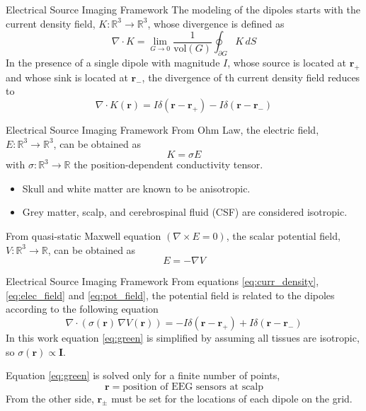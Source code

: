\documentclass[progressbar=head]{beamer}
\newcommand{\ppar}[1]{ \left( #1 \right) }
\newcommand{\id}{\mathbf{I}}
\newcommand{\R}{\mathbb{R}}
\newcommand{\rr}{\mathbf{r}}
\begin{document}
\begin{frame}{Electrical Source Imaging Framework}
    The modeling of the dipoles starts with the \alert{current density field}, $K: \R^3 \rightarrow \R^3$, whose divergence is defined as
    \begin{equation}
        \nabla \cdot K = \lim_{G \rightarrow 0} \frac{1}{\text{vol}\ppar{G}}
        \oint_{\partial G} K\, dS
    \end{equation}
    In the presence of a single dipole with magnitude $I$, whose source is located at $\rr_{+}$ and whose sink is located at $\rr_{-}$, the divergence of th current density field reduces to
    \begin{equation}
        \nabla \cdot K(\rr) = I \delta\ppar{\rr-\rr_+} - I \delta\ppar{\rr-\rr_-}
        \label{eq:curr_density}
    \end{equation}
\end{frame}

\begin{frame}{Electrical Source Imaging Framework}
From Ohm Law, the \alert{electric field}, $E: \R^3\rightarrow \R^3$, can be obtained as
\begin{equation}
    K = \sigma E
    \label{eq:elec_field}
\end{equation}
with $\sigma: \R^3 \rightarrow \R$ the position-dependent conductivity tensor.
\begin{itemize}
    \item Skull and white matter are known to be anisotropic.
    \item Grey matter, scalp, and cerebrospinal fluid (CSF) are considered isotropic.
\end{itemize}

From quasi-static Maxwell equation $\ppar{\nabla\times E=0}$, the \alert{scalar potential field}, $V: \R^3\rightarrow \R$, can be obtained as
\begin{equation}
    E = - \nabla V
    \label{eq:pot_field}
\end{equation}
\end{frame}

\begin{frame}{Electrical Source Imaging Framework}
From equations \eqref{eq:curr_density}, \eqref{eq:elec_field} and \eqref{eq:pot_field}, the potential field is related to the dipoles according to the following equation
\begin{equation}
\nabla \cdot\ppar{\sigma(\rr)\, \nabla V(\rr) } = 
-I \delta\ppar{\rr-\rr_+} + I \delta\ppar{\rr-\rr_-}
\label{eq:green}
\end{equation}
In this work equation \eqref{eq:green} is simplified by assuming 
all tissues are isotropic, so $\sigma(\rr)\propto \id$.

Equation \eqref{eq:green} is solved 
only for a finite number of points, 
\begin{equation*}
    \rr = \text{position of EEG sensors at scalp}
\end{equation*}
From the other side, $\rr_\pm$ must be set for the locations of each dipole on the grid.
\end{frame}
\end{document}
